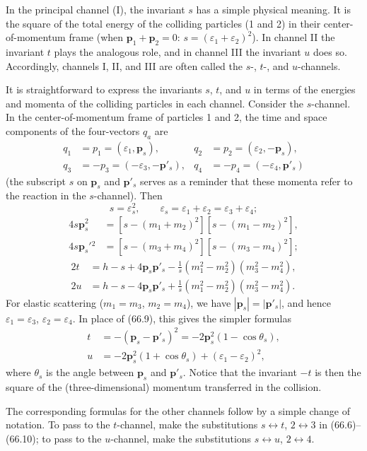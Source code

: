 In the principal channel (I), the invariant $s$ has a simple physical meaning. It is the square of the total energy of the colliding particles (1 and 2) in their center-of-momentum frame (when $\mathbf p_1+\mathbf p_2=0$: $s=(\varepsilon_1+\varepsilon_2)^2$). In channel II the invariant $t$ plays the analogous role, and in channel III the invariant $u$ does so. Accordingly, channels I, II, and III are often called the $s$-, $t$-, and $u$-channels.

It is straightforward to express the invariants $s$, $t$, and $u$ in terms of the energies and momenta of the colliding particles in each channel. Consider the $s$-channel. In the center-of-momentum frame of particles 1 and 2, the time and space components of the four-vectors $q_a$ are
\begin{equation}
\begin{aligned}
q_1&=p_1=(\varepsilon_1,\mathbf p_s),&
q_2&=p_2=(\varepsilon_2,-\mathbf p_s),\\
q_3&=-p_3=(-\varepsilon_3,-\mathbf p'_s),&
q_4&=-p_4=(-\varepsilon_4,\mathbf p'_s)
\end{aligned}
\tag{66.6}
\end{equation}
(the subscript $s$ on $\mathbf p_s$ and $\mathbf p'_s$ serves as a reminder that these momenta refer to the reaction in the $s$-channel). Then
\begin{equation}
s=\varepsilon_s^2,\qquad
\varepsilon_s=\varepsilon_1+\varepsilon_2=\varepsilon_3+\varepsilon_4;
\tag{66.7}
\end{equation}
\begin{equation}
\begin{aligned}
4s\mathbf p_s^2&=[s-(m_1+m_2)^2][s-(m_1-m_2)^2],\\
4s\mathbf p_s'{}^2&=[s-(m_3+m_4)^2][s-(m_3-m_4)^2];
\end{aligned}
\tag{66.8}
\end{equation}
\begin{equation}
\begin{aligned}
2t&=h-s+4\mathbf p_s\mathbf p'_s
-\frac1s(m_1^2-m_2^2)(m_3^2-m_4^2),\\
2u&=h-s-4\mathbf p_s\mathbf p'_s
+\frac1s(m_1^2-m_2^2)(m_3^2-m_4^2).
\end{aligned}
\tag{66.9}
\end{equation}
For elastic scattering ($m_1=m_3$, $m_2=m_4$), we have $|\mathbf p_s|=|\mathbf p'_s|$, and hence $\varepsilon_1=\varepsilon_3$, $\varepsilon_2=\varepsilon_4$. In place of (66.9), this gives the simpler formulas
\begin{equation}
\begin{aligned}
t&=-(\mathbf p_s-\mathbf p'_s)^2
=-2\mathbf p_s^2(1-\cos\theta_s),\\
u&=-2\mathbf p_s^2(1+\cos\theta_s)+(\varepsilon_1-\varepsilon_2)^2,
\end{aligned}
\tag{66.10}
\end{equation}
where $\theta_s$ is the angle between $\mathbf p_s$ and $\mathbf p'_s$. Notice that the invariant $-t$ is then the square of the (three-dimensional) momentum transferred in the collision.

The corresponding formulas for the other channels follow by a simple change of notation. To pass to the $t$-channel, make the substitutions $s\leftrightarrow t$, $2\leftrightarrow3$ in (66.6)--(66.10); to pass to the $u$-channel, make the substitutions $s\leftrightarrow u$, $2\leftrightarrow4$.
